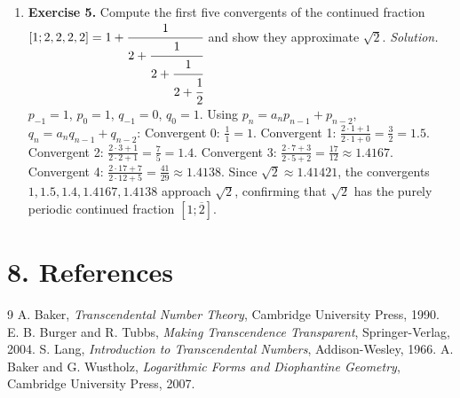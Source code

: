 \begin{enumerate}[leftmargin=*,itemsep=0.9em]
\item \textbf{Exercise 5.} Compute the first five convergents of the continued fraction $[1; 2, 2, 2, 2] = 1 + \cfrac{1}{2 + \cfrac{1}{2 + \cfrac{1}{2 + \cfrac{1}{2}}}}$ and show they approximate $\sqrt{2}$. \emph{Solution.}$p_{-1} = 1$, $p_0 = 1$, $q_{-1} = 0$, $q_0 = 1$. Using $p_n = a_n p_{n-1} + p_{n-2}$, $q_n = a_n q_{n-1} + q_{n-2}$: Convergent 0: $\frac{1}{1} = 1$. Convergent 1: $\frac{2 \cdot 1 + 1}{2 \cdot 1 + 0} = \frac{3}{2} = 1.5$. Convergent 2: $\frac{2 \cdot 3 + 1}{2 \cdot 2 + 1} = \frac{7}{5} = 1.4$. Convergent 3: $\frac{2 \cdot 7 + 3}{2 \cdot 5 + 2} = \frac{17}{12} \approx 1.4167$. Convergent 4: $\frac{2 \cdot 17 + 7}{2 \cdot 12 + 5} = \frac{41}{29} \approx 1.4138$. Since $\sqrt{2} \approx 1.41421$, the convergents $1, 1.5, 1.4, 1.4167, 1.4138$ approach $\sqrt{2}$, confirming that $\sqrt{2}$ has the purely periodic continued fraction $[1; \overline{2}]$.

\end{enumerate}
\section*{8. References}
\begin{thebibliography}{9}
 A. Baker, \emph{Transcendental Number Theory}, Cambridge University Press, 1990.
 E. B. Burger and R. Tubbs, \emph{Making Transcendence Transparent}, Springer-Verlag, 2004.
 S. Lang, \emph{Introduction to Transcendental Numbers}, Addison-Wesley, 1966.
 A. Baker and G. Wustholz, \emph{Logarithmic Forms and Diophantine Geometry}, Cambridge University Press, 2007.
\end{thebibliography}
